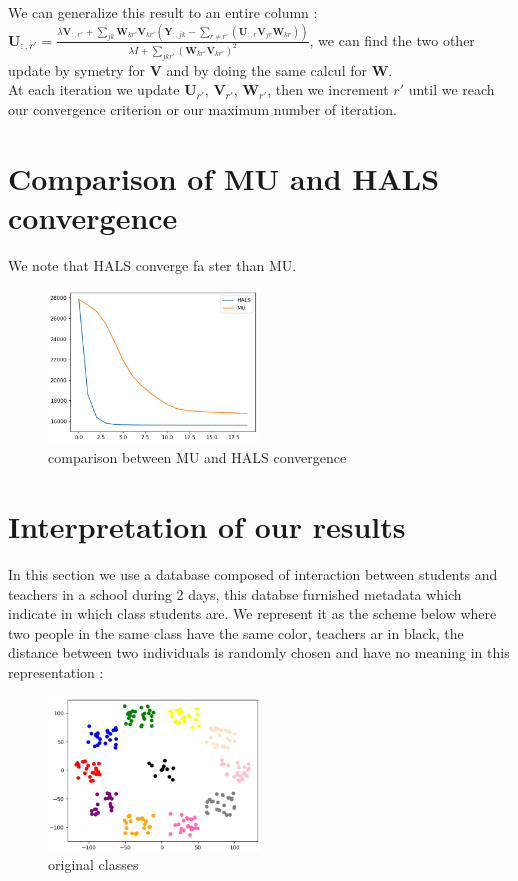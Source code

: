 \documentclass{article}
\begin{document}
We can generalize this result to an entire column : $\mathbf{U}_{:,r'} = \frac{\lambda \mathbf{V}_{:,r'} + \sum_{jk}\mathbf{W}_{kr'}\mathbf{V}_{kr'}(\mathbf{Y}_{:,jk}-\sum_{r \ne r'}(\mathbf{U}_{:,r}\mathbf{V}_{jr}\mathbf{W}_{kr}))}{\lambda I + \sum_{jkr'}(\mathbf{W}_{kr'}\mathbf{V}_{kr'})^2}$,
we can find the two other update by symetry for $\mathbf{V}$ and by doing the same calcul for $\mathbf{W}$.\\

At each iteration we update $\mathbf{U}_{r'}$, $\mathbf{V}_{r'}$, $\mathbf{W}_{r'}$,  then we increment $r'$ until we reach our convergence criterion or our maximum number of iteration.

\section{Comparison of MU and HALS convergence}

We note that HALS converge fa   ster than MU.

\begin{figure}[H]
    \centering
    \includegraphics[width=0.5\textwidth]{images/comparison_HALS_MU.png}
    \caption{comparison between MU and HALS convergence}
\end{figure}



\section{Interpretation of our results}

In this section we use a database composed of interaction between students and teachers in a school during 2 days, this databse furnished
metadata which indicate in which class students are. We represent it as the scheme below where two people in the same class have the same color, teachers ar in black,
the distance between two individuals is randomly chosen and have no meaning in this representation :

\begin{figure}[H]
    \centering
    \includegraphics[width=0.5\textwidth]{images/original_class.png}
    \caption{original classes}
\end{figure}
\end{document}
